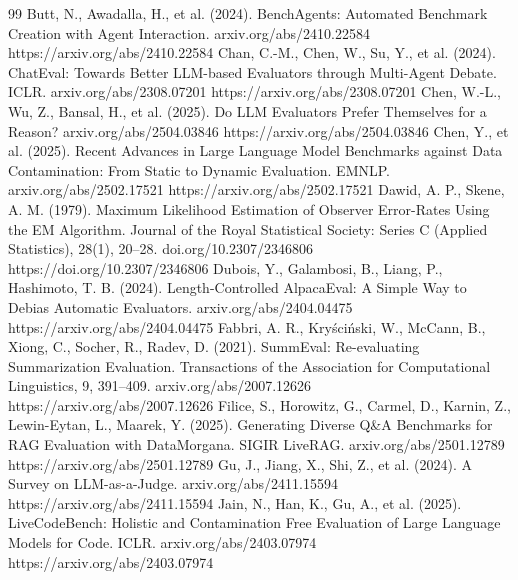 \begin{thebibliography}{99}
\setlength{\itemsep}{2pt plus 0.5pt}\setlength{\parsep}{0pt}
\label{r10} Butt, N., Awadalla, H., et al. (2024). BenchAgents: Automated Benchmark Creation with Agent
    Interaction. arxiv.org/abs/2410.22584 https://arxiv.org/abs/2410.22584
\label{r21} Chan, C.-M., Chen, W., Su, Y., et al. (2024). ChatEval: Towards Better LLM-based Evaluators through
    Multi-Agent Debate. ICLR. arxiv.org/abs/2308.07201 https://arxiv.org/abs/2308.07201
\label{r24} Chen, W.-L., Wu, Z., Bansal, H., et al. (2025). Do LLM Evaluators Prefer Themselves for a
    Reason? arxiv.org/abs/2504.03846 https://arxiv.org/abs/2504.03846
\label{r32} Chen, Y., et al. (2025). Recent Advances in Large Language Model Benchmarks against Data
    Contamination: From Static to Dynamic Evaluation. EMNLP. arxiv.org/abs/2502.17521 https://arxiv.org/abs/2502.17521
\label{r33} Dawid, A. P., Skene, A. M. (1979). Maximum Likelihood Estimation of Observer Error-Rates Using
    the EM Algorithm. Journal of the Royal Statistical Society: Series C (Applied Statistics), 28(1), 20–28. doi.org/10.2307/2346806 https://doi.org/10.2307/2346806
\label{r8} Dubois, Y., Galambosi, B., Liang, P., Hashimoto, T. B. (2024). Length-Controlled AlpacaEval: A Simple
    Way to Debias Automatic Evaluators. arxiv.org/abs/2404.04475 https://arxiv.org/abs/2404.04475
\label{r37} Fabbri, A. R., Kryściński, W., McCann, B., Xiong, C., Socher, R., Radev, D. (2021). SummEval: Re-evaluating Summarization Evaluation. Transactions of the Association for Computational
    Linguistics, 9, 391–409. arxiv.org/abs/2007.12626 https://arxiv.org/abs/2007.12626
\label{r31} Filice, S., Horowitz, G., Carmel, D., Karnin, Z., Lewin-Eytan, L., Maarek, Y. (2025). Generating
    Diverse Q\&A Benchmarks for RAG Evaluation with DataMorgana. SIGIR LiveRAG. arxiv.org/abs/2501.12789 https://arxiv.org/abs/2501.12789
\label{r19} Gu, J., Jiang, X., Shi, Z., et al. (2024). A Survey on LLM-as-a-Judge. arxiv.org/abs/2411.15594 https://arxiv.org/abs/2411.15594
\label{r23} Jain, N., Han, K., Gu, A., et al. (2025). LiveCodeBench: Holistic and Contamination Free Evaluation
    of Large Language Models for Code. ICLR. arxiv.org/abs/2403.07974 https://arxiv.org/abs/2403.07974

\end{thebibliography}
